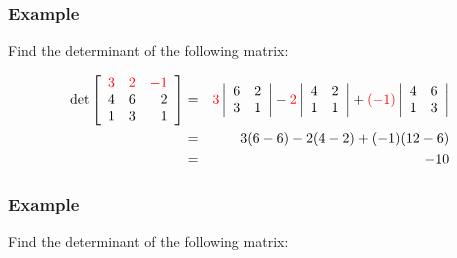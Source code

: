 \begin{frame}
  \frametitle{Example}

  Find the determinant of the following matrix:

  \begin{eqnarray*}
    \mathrm{det}
    \left[ \begin{array}{rrr} {\color{red}3} & {\color{red}2} & {\color{red}-1} \\ 4 & 6 & 2 \\ 1 & 3 & 1 \end{array} \right]
    & = & 
    {\color{red}3} \left| \begin{array}{rr} 6 & 2 \\ 3 & 1 \end{array} \right| - {\color{red}2} \left| \begin{array}{rr} 4 & 2 \\ 1 & 1 \end{array} \right|
    + {\color{red}(-1)} \left| \begin{array}{rr} 4 & 6 \\ 1 & 3 \end{array} \right| \\
    & = & 3 (6-6) - 2(4-2) + (-1) (12-6) \\
    & = & -10
  \end{eqnarray*}

\end{frame}




\begin{frame}
  \frametitle{Example}
  Find the determinant of the following matrix:






\end{frame}


